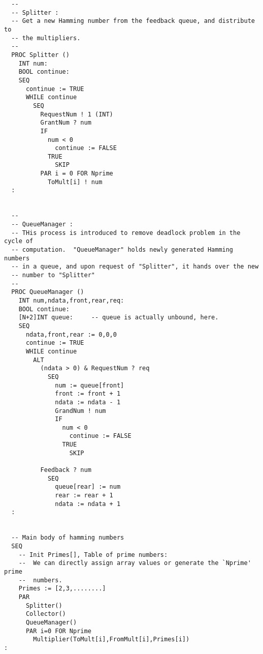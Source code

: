 \begin{small}
\begin{verbatim}
  -- 
  -- Splitter :
  -- Get a new Hamming number from the feedback queue, and distribute to
  -- the multipliers.
  --
  PROC Splitter ()
    INT num:
    BOOL continue:
    SEQ
      continue := TRUE
      WHILE continue
        SEQ
          RequestNum ! 1 (INT)
          GrantNum ? num
          IF 
            num < 0
              continue := FALSE
            TRUE
              SKIP
          PAR i = 0 FOR Nprime
            ToMult[i] ! num
  :


  --
  -- QueueManager :
  -- THis process is introduced to remove deadlock problem in the cycle of
  -- computation.  "QueueManager" holds newly generated Hamming numbers 
  -- in a queue, and upon request of "Splitter", it hands over the new
  -- number to "Splitter"
  --
  PROC QueueManager ()
    INT num,ndata,front,rear,req:
    BOOL continue:
    [N+2]INT queue:		-- queue is actually unbound, here.
    SEQ
      ndata,front,rear := 0,0,0
      continue := TRUE
      WHILE continue
        ALT
          (ndata > 0) & RequestNum ? req
            SEQ
              num := queue[front]
              front := front + 1
              ndata := ndata - 1
              GrandNum ! num
              IF
                num < 0
                  continue := FALSE
                TRUE
                  SKIP

          Feedback ? num
            SEQ
              queue[rear] := num
              rear := rear + 1
              ndata := ndata + 1
  :


  -- Main body of hamming numbers
  SEQ
    -- Init Primes[], Table of prime numbers:
    -- 	We can directly assign array values or generate the `Nprime' prime 
    -- 	numbers.
    Primes := [2,3,........]
    PAR
      Splitter()
      Collector()
      QueueManager()
      PAR i=0 FOR Nprime
        Multiplier(ToMult[i],FromMult[i],Primes[i])
:
\end{verbatim}
\end{small}
\setlength{\baselineskip}{3ex}
\setlength{\baselineskip}{2ex}
